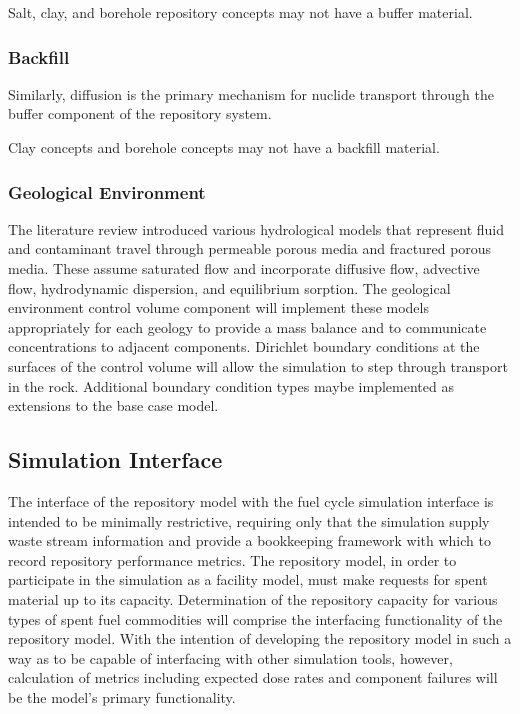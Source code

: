 Salt, clay, and borehole repository concepts may not have a buffer 
material.

\subsubsection{Backfill}
Similarly, diffusion is the primary mechanism for nuclide transport 
through the buffer component of the repository system.

Clay concepts and borehole concepts may not have a backfill material. 


\subsubsection{Geological Environment}

The literature review introduced various hydrological models that represent
fluid and contaminant travel through permeable porous media and fractured porous 
media. These assume saturated flow and incorporate diffusive flow, advective 
flow, hydrodynamic dispersion, and equilibrium sorption. The geological 
environment control volume component will implement these models appropriately 
for each geology to provide a mass balance and to communicate concentrations to  
adjacent components.  Dirichlet boundary conditions at the surfaces of the 
control volume will allow the simulation to step through transport in the rock. 
Additional boundary condition types maybe implemented as extensions to the base 
case model.


\subsection{Simulation Interface}

The interface of the repository model with the \Cyclus fuel cycle 
simulation interface is intended to be minimally restrictive, 
requiring only that the simulation supply waste stream information and 
provide a bookkeeping framework with which to record repository 
performance metrics. The repository model, in order to participate in the 
simulation as a facility model, must make requests for spent material up 
to its capacity. Determination of the repository capacity for various 
types of spent fuel commodities will comprise the interfacing functionality of 
the repository model. With the intention of developing the repository model in 
such a way as to be capable of interfacing with other simulation tools, however, 
calculation of metrics including expected dose rates and 
component failures will be the model's primary functionality. 

